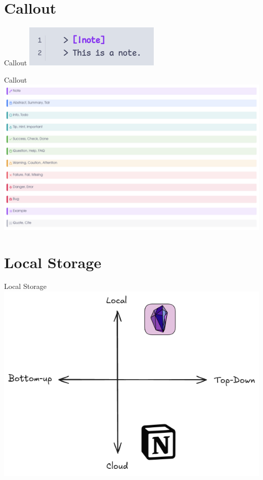 \documentclass[10pt, xcolor=dvipsnames]{beamer}
\begin{document}
	\section{Callout}
	\begin{frame}{Callout}\centering
		\includegraphics[width=.5\linewidth]{../latex-image/markdown-code4}
	\end{frame}
	\begin{frame}{Callout}\centering
		\includegraphics[width=1\linewidth]{../latex-image/callout}
	\end{frame}

	\section{Local Storage}
	\begin{frame}{Local Storage}\centering
		\includegraphics[width=.85\linewidth]{../latex-image/local-storage}
	\end{frame}
\end{document}
